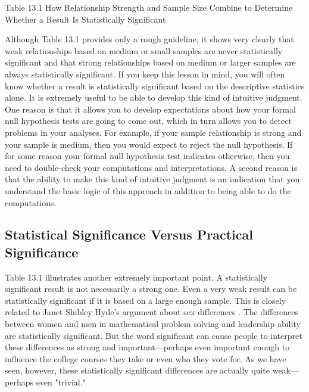 Table 13.1 How Relationship Strength and Sample Size Combine to Determine Whether a Result Is Statistically Significant



Although Table 13.1 provides only a rough guideline, it shows very clearly that weak relationships based on medium or small samples are never statistically significant and that strong relationships based on medium or larger samples are always statistically significant. If you keep this lesson in mind, you will often know whether a result is statistically significant based on the descriptive statistics alone. It is extremely useful to be able to develop this kind of intuitive judgment. One reason is that it allows you to develop expectations about how your formal null hypothesis tests are going to come out, which in turn allows you to detect problems in your analyses. For example, if your sample relationship is strong and your sample is medium, then you would expect to reject the null hypothesis. If for some reason your formal null hypothesis test indicates otherwise, then you need to double-check your computations and interpretations. A second reason is that the ability to make this kind of intuitive judgment is an indication that you understand the basic logic of this approach in addition to being able to do the computations.


\subsection{Statistical Significance Versus Practical Significance}


Table 13.1 illustrates another extremely important point. A statistically significant result is not necessarily a strong one. Even a very weak result can be statistically significant if it is based on a large enough sample. This is closely related to Janet Shibley Hyde's argument about sex differences \citep{hyde_new_2007}. The differences between women and men in mathematical problem solving and leadership ability are statistically significant. But the word significant can cause people to interpret these differences as strong and important---perhaps even important enough to influence the college courses they take or even who they vote for. As we have seen, however, these statistically significant differences are actually quite weak---perhaps even "trivial."


